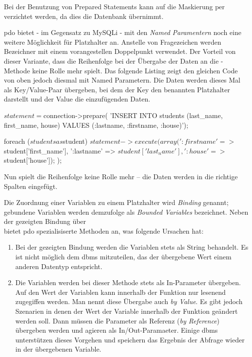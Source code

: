 Bei der Benutzung von Prepared Statements kann auf die Maskierung per  verzichtet werden, da dies die Datenbank übernimmt.

\gls{pdo} bietet - im Gegensatz zu MySQLi - mit den \textit{Named Paramentern} noch eine weitere Möglichkeit für Platzhalter an. Anstelle von Fragezeichen werden Bezeichner mit einem vorangestellen Doppelpunkt verwendet. Der Vorteil von dieser Variante, dass die Reihenfolge bei der Übergabe der Daten an die -Methode keine Rolle mehr spielt. Das folgende Listing zeigt den gleichen Code von oben jedoch diesmal mit Named Parametern. Die Daten werden dieses Mal als Key/Value-Paar übergeben, bei dem der Key den benannten Platzhalter darstellt und der Value die einzufügenden Daten.

\begin{phpcode}
$statement = $connection->prepare(
  'INSERT INTO students (last_name, first_name, house)
    VALUES (:lastname, :firstname, :house)');

foreach ($students as $student) {
	$statement->execute(
	  array(
	    ':firstname' => $student['first_name'],
	    ':lastname'  => $student['last_name'],
	    ':house'     => $student['house']);
	);
}
\end{phpcode}

Nun spielt die Reihenfolge keine Rolle mehr – die Daten werden in die richtige Spalten eingefügt.

Die Zuordnung einer Variablen zu einem Platzhalter wird \textit{Binding} genannt; gebundene Variablen werden demzufolge als \textit{Bounded Variables} bezeichnet. Neben der gezeigten Bindung über\\
 bietet \gls{pdo} spezialisiserte Methoden an, was folgende Ursachen hat:

\begin{enumerate}
	\item Bei der gezeigten Bindung werden die Variablen stets als String behandelt. Es ist nicht möglich dem \gls{dbms} mitzuteilen, das der übergebene Wert einem anderen Datentyp entspricht.
	\item Die Variablen werden bei dieser Methode stets als In-Parameter übergeben. Auf den Wert der Variablen kann innerhalb der Funktion nur lesenend zugegiffen werden. Man nennt diese Übergabe auch \textit{by Value}. Es gibt jedoch Szenarien in denen der Wert der Variable innerhalb der Funktion geändert werden soll. Dann müssen die Parameter als Referenz (\textit{by Reference}) übergeben werden und agieren als In/Out-Paramaeter. Einige \gls{dbms} unterstützen dieses Vorgehen und speichern das Ergebnis der Abfrage wieder in der übergebenen Variable.
\end{enumerate}


